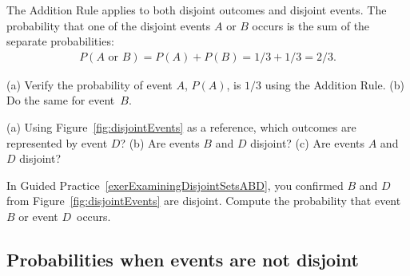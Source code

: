 The Addition Rule applies to both disjoint outcomes and disjoint events. The probability that one of the disjoint events $A$ or $B$ occurs is the sum of the separate probabilities:
\begin{align*}
P(A\text{ or }B) = P(A) + P(B) = 1/3 + 1/3 = 2/3.
\end{align*}

\begin{exercisewrap}
\begin{nexercise}
(a) Verify the probability of event $A$, $P(A)$, is $1/3$ using the Addition Rule. (b) Do the same for event~$B$.\footnotemark{}
\end{nexercise}
\end{exercisewrap}

\begin{exercisewrap}
\begin{nexercise}\label{exerExaminingDisjointSetsABD}%
(a) Using Figure~\ref{fig:disjointEvents} as a reference, which outcomes are represented by event $D$? (b) Are events $B$ and $D$ disjoint? (c) Are events $A$ and $D$ disjoint?\footnotemark{}
\end{nexercise}
\end{exercisewrap}

\textD{\newpage}

\begin{exercisewrap}
\begin{nexercise}
In Guided Practice~\ref{exerExaminingDisjointSetsABD}, you confirmed $B$ and $D$ from Figure~\ref{fig:disjointEvents} are disjoint. Compute the probability that event $B$ or event $D$~occurs.\footnotemark{}
\end{nexercise}
\end{exercisewrap}



\subsection{Probabilities when events are not disjoint}

